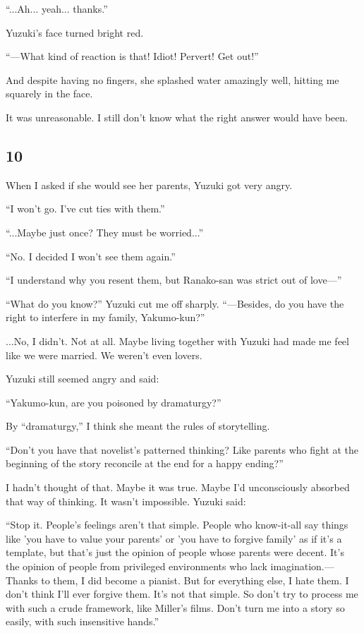 \documentclass[
    a4paper,
    12pt,
    twoside,
    openany,
    UTF8,
    fontset=windows
]{ctexbook}
\begin{document}
``...Ah... yeah... thanks.''

Yuzuki's face turned bright red.

``---What kind of reaction is that! Idiot! Pervert! Get out!''

And despite having no fingers, she splashed water amazingly well, hitting me squarely in the face.

It was unreasonable. I still don't know what the right answer would have been.


\subsection*{10}

When I asked if she would see her parents, Yuzuki got very angry.

``I won't go. I've cut ties with them.''

``...Maybe just once? They must be worried...''

``No. I decided I won't see them again.''

``I understand why you resent them, but Ranako-san was strict out of love---''

``What do you know?'' Yuzuki cut me off sharply. ``---Besides, do you have the right to interfere in my family, Yakumo-kun?''

...No, I didn't. Not at all. Maybe living together with Yuzuki had made me feel like we were married. We weren't even lovers.

Yuzuki still seemed angry and said:

``Yakumo-kun, are you poisoned by dramaturgy?''

By ``dramaturgy,'' I think she meant the rules of storytelling.

``Don't you have that novelist's patterned thinking? Like parents who fight at the beginning of the story reconcile at the end for a happy ending?''

I hadn't thought of that. Maybe it was true. Maybe I'd unconsciously absorbed that way of thinking. It wasn't impossible. Yuzuki said:

``Stop it. People's feelings aren't that simple. People who know-it-all say things like 'you have to value your parents' or 'you have to forgive family' as if it's a template, but that's just the opinion of people whose parents were decent. It's the opinion of people from privileged environments who lack imagination.---Thanks to them, I did become a pianist. But for everything else, I hate them. I don't think I'll ever forgive them. It's not that simple. So don't try to process me with such a crude framework, like Miller's films. Don't turn me into a story so easily, with such insensitive hands.''
\end{document}
